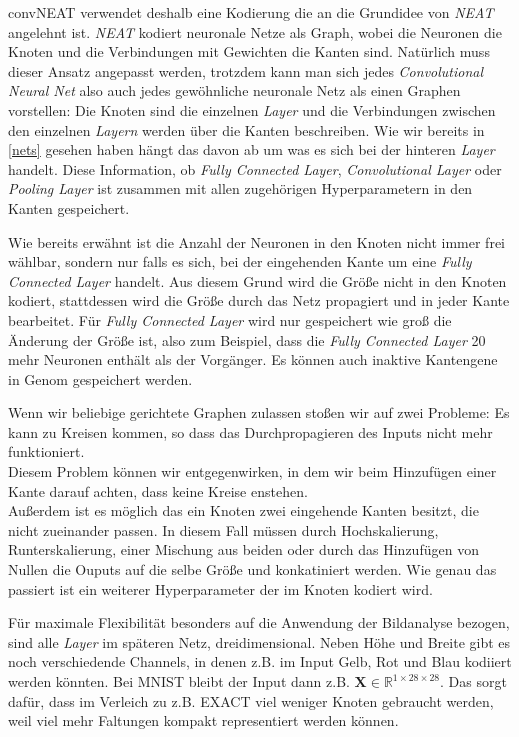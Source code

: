 \documentclass[]{scrartcl}
\begin{document}
			convNEAT verwendet deshalb eine Kodierung die an die Grundidee von \textit{NEAT} angelehnt ist.
			\textit{NEAT} kodiert neuronale Netze als Graph, wobei die Neuronen die Knoten und die Verbindungen mit Gewichten die Kanten sind.
			Natürlich muss dieser Ansatz angepasst werden, trotzdem kann man sich jedes \textit{Convolutional Neural Net}
			also auch jedes gewöhnliche neuronale Netz als einen Graphen vorstellen:
			Die Knoten sind die einzelnen \textit{Layer} und die Verbindungen zwischen den einzelnen \textit{Layern} werden über die Kanten beschreiben.
			Wie wir bereits in \ref{nets} gesehen haben hängt das davon ab um was es sich bei der hinteren \textit{Layer} handelt.
			Diese Information, ob \textit{Fully Connected Layer}, \textit{Convolutional Layer} oder \textit{Pooling Layer} ist zusammen mit allen
			zugehörigen Hyperparametern in den Kanten gespeichert.

			Wie bereits erwähnt ist die Anzahl der Neuronen in den Knoten nicht immer frei wählbar, sondern nur falls es sich, bei der eingehenden Kante
			um eine \textit{Fully Connected Layer} handelt. Aus diesem Grund wird die Größe nicht in den Knoten kodiert,
			stattdessen wird die Größe durch das Netz propagiert und in jeder Kante bearbeitet. Für \textit{Fully Connected Layer} wird nur gespeichert
			wie groß die Änderung der Größe ist, also zum Beispiel, dass die \textit{Fully Connected Layer} 20 mehr Neuronen enthält als der Vorgänger.
			Es können auch inaktive Kantengene in Genom gespeichert werden.

			Wenn wir beliebige gerichtete Graphen zulassen stoßen wir auf zwei Probleme:
			Es kann zu Kreisen kommen, so dass das Durchpropagieren des Inputs nicht mehr funktioniert. \\
			Diesem Problem können wir entgegenwirken, in dem wir beim Hinzufügen einer Kante darauf achten, dass keine Kreise enstehen. \\
			Außerdem ist es möglich das ein Knoten zwei eingehende Kanten besitzt, die nicht zueinander passen.
			In diesem Fall müssen durch Hochskalierung, Runterskalierung, einer Mischung aus beiden oder durch das Hinzufügen von Nullen die 
			Ouputs auf die selbe Größe und konkatiniert werden. Wie genau das passiert ist ein weiterer Hyperparameter der im Knoten kodiert wird.

			Für maximale Flexibilität besonders auf die Anwendung der Bildanalyse bezogen, sind alle \textit{Layer} im späteren Netz, dreidimensional.
			Neben Höhe und Breite gibt es noch verschiedende Channels, in denen z.B. im Input Gelb, Rot und Blau kodiiert werden könnten.
			Bei MNIST bleibt der Input dann z.B. $\mathbf{X} \in \mathbb{R}^{1 \times 28 \times 28}$.
			Das sorgt dafür, dass im Verleich zu z.B. EXACT \cite{exact} viel weniger Knoten gebraucht werden, weil viel mehr Faltungen kompakt
			representiert werden können.
\end{document}
